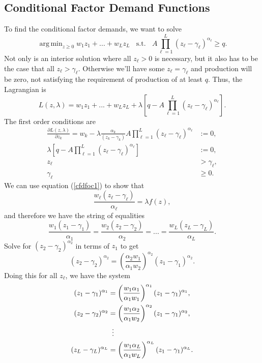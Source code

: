 \documentclass[12pt]{article}
\DeclareMathOperator*{\argmin}{arg\,min}
\theoremstyle{definition}
\begin{document}
\subsection{Conditional Factor Demand Functions}
To find the conditional factor demands, we want to solve
	\[	\argmin_{z \geq 0} w_1z_1 + ... + w_{L}z_{L}  \;\; \text{ s.t. } \;\; A \prod_{\ell = 1}^{L} (z_{\ell} - \gamma_{\ell})^{\alpha_{\ell}} \geq q. 			\]	
Not only is an interior solution where all $z_{\ell}>0$ is necessary, but it also has to be the case that all $z_{\ell} > \gamma_{\ell}$. Otherwise we'll have some $z_{\ell} = \gamma_{\ell}$ and production will be zero, not satisfying the requirement of production of at least $q$. Thus, the Lagrangian is 
	\[	L(z, \lambda) = w_1z_1 + ... + w_Lz_L + \lambda\left[q -  A \prod_{\ell = 1}^{L} (z_{\ell} - \gamma_{\ell})^{\alpha_{\ell}} \right].	\]	
The first order conditions are
\begin{align}
	\frac{\partial L(z, \lambda)}{\partial z_k} = w_k - \lambda \frac{\alpha_{k}}{( z_{k} - \gamma_{k})}A \prod_{\ell = 1}^{L} (z_{\ell} - \gamma_{\ell})^{\alpha_{\ell}} &:=0, \label{cfdfoc1}\\
	 \lambda\left[q -  A \prod_{\ell = 1}^{L} (z_{\ell} - \gamma_{\ell})^{\alpha_{\ell}} \right] &:=0, \label{cfdfoc2}\\
 	z_{\ell} &> \gamma_{\ell},\\
 	\gamma_{\ell} &\geq 0.
\end{align}
We can use equation (\ref{cfdfoc1}) to show that
	\[\frac{w_{\ell} (z_{\ell} - \gamma_{\ell})}{\alpha_{\ell}}	 = \lambda f(z),	\]
and therefore we have the string of equalities
	\[\frac{w_{1} (z_{1} - \gamma_{1})}{\alpha_{1}} = \frac{w_2 (z_2 - \gamma_2)}{\alpha_2} = ... = \frac{w_{L} (z_{L} - \gamma_{L})}{\alpha_{L}}.		\]
Solve for $(z_2 - \gamma_2)^{\alpha_2}$ in terms of $z_1$ to get
	\[(z_2 - \gamma_2)^{\alpha_2} = \left(\frac{\alpha_2 w_1}{\alpha_1 w_2}\right)^{\alpha_2}	(z_1 - \gamma_1)^{\alpha_2} .\]
Doing this for all $z_{\ell}$, we have the system
\begin{align*}
	(z_1 - \gamma_1)^{\alpha_1} &= \left(\frac{w_1 \alpha_1}{\alpha_1 w_1} \right)^{\alpha_1}(z_1  - \gamma_1)^{\alpha_1} ,\\
	(z_2 - \gamma_2)^{\alpha_2} &= \left( \frac{ w_1 \alpha_2}{\alpha_1 w_2} \right)^{\alpha_2}(z_1  - \gamma_1)^{\alpha_2} ,\\
	&\mathrel{\makebox[\widthof{=}]{\vdots}} \\
	(z_L - \gamma_L)^{\alpha_L} &= \left( \frac{ w_1 \alpha_L}{\alpha_1 w_L} \right)^{\alpha_L}(z_1  - \gamma_1)^{\alpha_L}.
\end{align*}
\end{document}
